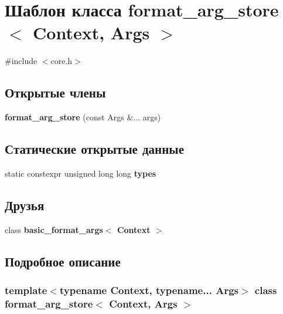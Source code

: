 \hypertarget{classformat__arg__store}{}\section{Шаблон класса format\+\_\+arg\+\_\+store$<$ Context, Args $>$}
\label{classformat__arg__store}


{\ttfamily \#include $<$core.\+h$>$}

\subsection*{Открытые члены}
\begin{DoxyCompactItemize}
\item 
\mbox{\label{classformat__arg__store_a785430d11d4e8e5dcd9f231e7d69695e}} 
{\bfseries format\+\_\+arg\+\_\+store} (const Args \&... args)
\end{DoxyCompactItemize}
\subsection*{Статические открытые данные}
\begin{DoxyCompactItemize}
\item 
static constexpr unsigned long long {\bfseries types}
\end{DoxyCompactItemize}
\subsection*{Друзья}
\begin{DoxyCompactItemize}
\item 
\mbox{\label{classformat__arg__store_ab8e9e33cc7b78829001a86ef6110ebb6}} 
class {\bfseries basic\+\_\+format\+\_\+args$<$ Context $>$}
\end{DoxyCompactItemize}


\subsection{Подробное описание}
\subsubsection*{template$<$typename Context, typename... Args$>$\newline
class format\+\_\+arg\+\_\+store$<$ Context, Args $>$}

